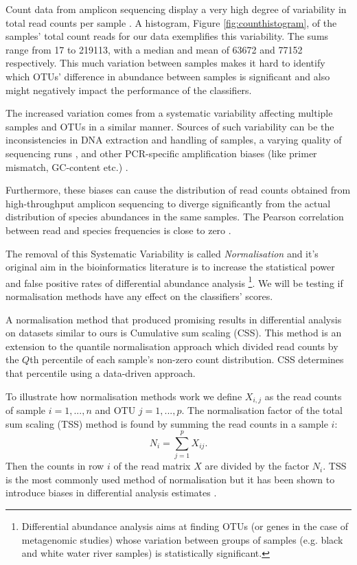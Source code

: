 Count data from amplicon sequencing display a very high degree of variability in total read counts per sample \cite{inadmissible_rareying}. A histogram, Figure \ref{fig:counthistogram}, of the samples' total count reads for our data exemplifies this variability. The sums range from 17 to 219113, with a median and mean of 63672 and 77152 respectively. This much variation between samples makes it hard to identify which OTUs' difference in abundance between samples is significant and also might negatively impact the performance of the classifiers. 
 
 The increased variation comes from a systematic variability affecting multiple samples and OTUs in a similar manner. Sources of such variability can be the inconsistencies in DNA extraction and handling of samples,  a varying quality of sequencing runs \cite{pereira_comparison_2018}, and other PCR-specific amplification biases (like primer mismatch, GC-content etc.) \cite{abundance_nodate,krehenwinkel_estimating_2017}.
 
 Furthermore, these biases can cause the distribution of read counts obtained from high-throughput amplicon sequencing to diverge significantly from the actual distribution of species abundances in the same samples. The Pearson correlation between read and species frequencies is close to zero \cite{edgar_unbias:_2017}.
 
 The removal of this Systematic Variability is called \textit{Normalisation} and it's original aim in the bioinformatics literature is to increase the statistical power and false positive rates of differential abundance analysis \footnote{Differential abundance analysis aims at finding OTUs (or genes in the case of metagenomic studies) whose variation between groups of samples (e.g. black and white water river samples) is statistically significant.}. We will be testing if normalisation methods have any effect on the classifiers' scores.
 
 A normalisation method that produced promising results in differential analysis on datasets similar to ours is Cumulative sum scaling (CSS). This method is an extension to the quantile normalisation approach which divided read counts by the $Q$th percentile of each sample’s non-zero count distribution. CSS determines that percentile using a data-driven approach\cite{css_diff_abund}.
 
 To illustrate how normalisation methods work we define $X_{i,j}$ as the read counts of sample  $i =1,...,n$ and OTU $j=1,...,p$. The normalisation factor of the total sum scaling (TSS) method is found by summing the read counts in a sample $i$:
 \begin{equation}
 	N_i = \sum_{j=1}^{p} X_{ij}.
 \end{equation}
Then the counts in row $i$ of the read matrix $X$ are divided by the factor $N_i$. TSS is the most commonly used method of normalisation but it has been shown to introduce biases in differential analysis estimates \cite{bullard_evaluation_2010}.

